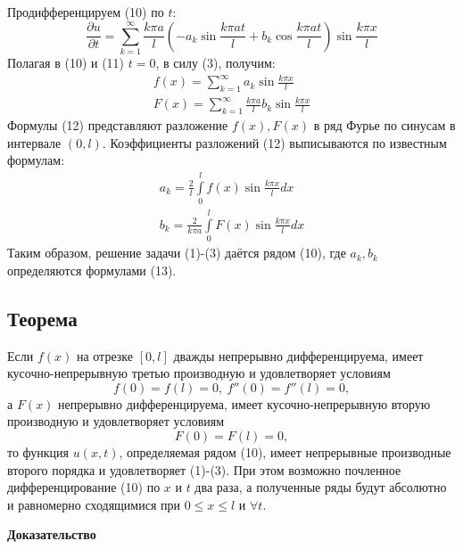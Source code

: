 \begin{enumerate}
{			Продифференцируем (10) по $t$:
			\[
				\frac{\partial u}{\partial t} = \sum_{k=1}^\infty \frac{k \pi a}{l} \left( -a_k \sin \frac{k \pi at}{l} + b_k \cos \frac{k \pi at}{l} \right) \sin \frac{k \pi x}{l} \tag{11}
			\]
			Полагая в (10) и (11) $t=0$, в силу (3), получим:
			\[
				\begin{aligned}
					f(x) = \sum_{k=1}^\infty a_k \sin \frac{k \pi x}{l} \\
					F(x) = \sum_{k=1}^\infty \frac{k \pi a}{l} b_k \sin \frac{k \pi x}{l}
				\end{aligned}
				\tag{12}
			\]
			Формулы (12) представляют разложение $f(x), F(x)$ в ряд Фурье по синусам в интервале $(0, l)$. Коэффициенты разложений (12) выписываются по известным формулам:
			\[
				\begin{aligned}
					a_k = \frac{2}{l} \int\limits_0^l f(x) \sin \frac{k \pi x}{l} dx \\
					b_k = \frac{2}{k \pi a} \int\limits_0^l F(x) \sin \frac{k \pi x}{l} dx
				\end{aligned}
				\tag{13}
			\]
			Таким образом, решение задачи (1)-(3) даётся рядом (10), где $a_k, b_k$ определяются формулами (13).
	}
\end{enumerate}
\subsection{Теорема}
Если $f(x)$ на отрезке $[0, l]$ дважды непрерывно дифференцируема, имеет кусочно-непрерывную третью производную и удовлетворяет условиям
\[
	f(0) = f(l) = 0, ~ f''(0) = f''(l) = 0, \tag{14}
\]
а $F(x)$ непрерывно дифференцируема, имеет кусочно-непрерывную вторую производную и удовлетворяет условиям
\[
	F(0) = F(l) = 0, \tag{15}
\]
то функция $u(x, t)$, определяемая рядом (10), имеет непрерывные производные второго порядка и удовлетворяет (1)-(3). При этом возможно почленное дифференцирование (10) по $x$ и $t$ два раза, а полученные ряды будут абсолютно и равномерно сходящимися при $0 \le x \le l$ и $\forall t$.

\textbf{Доказательство}

